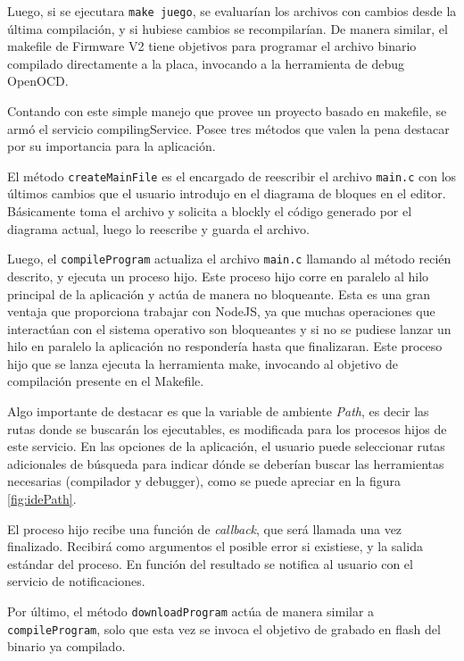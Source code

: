 Luego, si se ejecutara \texttt{make juego}, se evaluarían los archivos con cambios desde la última compilación, y si hubiese cambios se recompilarían. De manera similar, el makefile de Firmware V2 tiene objetivos para programar el archivo binario compilado directamente a la placa, invocando a la herramienta de debug OpenOCD.

Contando con este simple manejo que provee un proyecto basado en makefile, se armó el servicio compilingService. Posee tres métodos que valen la pena destacar por su importancia para la aplicación.

El método \texttt{createMainFile} es el encargado de reescribir el archivo \texttt{main.c} con los últimos cambios que el usuario introdujo en el diagrama de bloques en el editor. Básicamente toma el archivo y solicita a blockly el código generado por el diagrama actual, luego lo reescribe y guarda el archivo.

Luego, el \texttt{compileProgram} actualiza el archivo \texttt{main.c} llamando al método recién descrito, y ejecuta un proceso hijo. Este proceso hijo corre en paralelo al hilo principal de la aplicación y actúa de manera no bloqueante. Esta es una gran ventaja que proporciona trabajar con NodeJS, ya que muchas operaciones que interactúan con el sistema operativo son bloqueantes y si no se pudiese lanzar un hilo en paralelo la aplicación no respondería hasta que finalizaran. Este proceso hijo que se lanza ejecuta la herramienta make, invocando al objetivo de compilación presente en el Makefile.

Algo importante de destacar es que la variable de ambiente \emph{Path}, es decir las rutas donde se buscarán los ejecutables, es modificada para los procesos hijos de este servicio. En las opciones de la aplicación, el usuario puede seleccionar rutas adicionales de búsqueda para indicar dónde se deberían buscar las herramientas necesarias (compilador y debugger), como se puede apreciar en la figura \ref{fig:idePath}.

El proceso hijo recibe una función de \emph{callback}, que será llamada una vez finalizado. Recibirá como argumentos el posible error si existiese, y la salida estándar del proceso. En función del resultado se notifica al usuario con el servicio de notificaciones.

Por último, el método \texttt{downloadProgram} actúa de manera similar a \texttt{compileProgram}, solo que esta vez se invoca el objetivo de grabado en flash del binario ya compilado.

